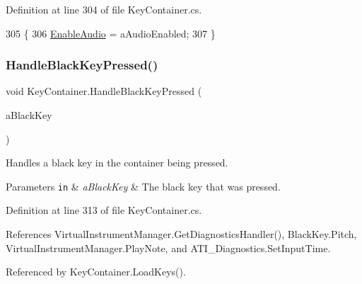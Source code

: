 Definition at line 304 of file Key\+Container.\+cs.


\begin{DoxyCode}
305     \{
306         \hyperlink{group___key_contain_pub_var_ga5dc9b1349f8fafc894c7f739f6780a8c}{EnableAudio} = aAudioEnabled;
307     \}
\end{DoxyCode}
\mbox{\label{group___key_contain_handlers_ga05cc2543fd9772b26e27bf4f6247ab47}} 
\subsubsection{\texorpdfstring{Handle\+Black\+Key\+Pressed()}{HandleBlackKeyPressed()}}
{\footnotesize\ttfamily void Key\+Container.\+Handle\+Black\+Key\+Pressed (\begin{DoxyParamCaption}\item[{\hyperlink{class_black_key}{Black\+Key}}]{a\+Black\+Key }\end{DoxyParamCaption})\hspace{0.3cm}{\ttfamily [private]}}



Handles a black key in the container being pressed. 


\begin{DoxyParams}[1]{Parameters}
\mbox{\tt in}  & {\em a\+Black\+Key} & The black key that was pressed. \\
\hline
\end{DoxyParams}


Definition at line 313 of file Key\+Container.\+cs.



References Virtual\+Instrument\+Manager.\+Get\+Diagnostics\+Handler(), Black\+Key.\+Pitch, Virtual\+Instrument\+Manager.\+Play\+Note, and A\+T\+I\+\_\+\+Diagnostics.\+Set\+Input\+Time.



Referenced by Key\+Container.\+Load\+Keys().


